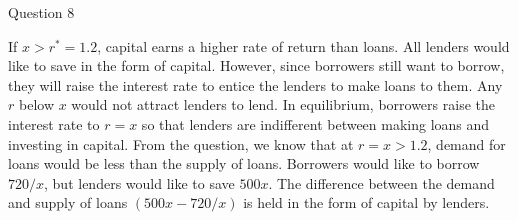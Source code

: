 \documentclass[a4paper]{article}
\newif\IfInSansMode
\numberwithin{equation}{section}
\numberwithin{figure}{section}
\begin{document}
\begin{questionbox}{Question 8}
\begin{enumerate}[(a)]
			\begin{explanationbox}
				If \( x > r^* =1.2 \), capital earns a higher rate of return than loans. All lenders would like to save in the form of capital. However, since borrowers still want to borrow, they will raise the interest rate to entice the lenders to make loans to them. Any \( r \) below \( x \) would not attract lenders to lend. In equilibrium, borrowers raise the interest rate to \( r=x \) so that lenders are indifferent between making loans and investing in capital. From the question, we know that at \( r = x > 1.2 \), demand for loans would be less than the supply of loans. Borrowers would like to borrow \( 720/x \), but lenders would like to save \( 500x \). The difference between the demand and supply of loans \( (500x - 720/x) \) is held in the form of capital by lenders.
			\end{explanationbox}
		\end{enumerate}
	\end{questionbox}
\end{document}
